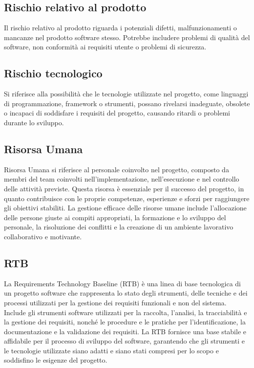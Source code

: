\subsection{Rischio relativo al prodotto} 
Il rischio relativo al prodotto riguarda i potenziali difetti, malfunzionamenti o mancanze nel prodotto software stesso. Potrebbe includere problemi di qualità del software, non conformità ai requisiti utente o problemi di sicurezza.
\subsection{Rischio tecnologico} 
Si riferisce alla possibilità che le tecnologie utilizzate nel progetto, come linguaggi di programmazione, framework o strumenti, possano rivelarsi inadeguate, obsolete o incapaci di soddisfare i requisiti del progetto, causando ritardi o problemi durante lo sviluppo.
\subsection{Risorsa Umana} 
Risorsa Umana si riferisce al personale coinvolto nel progetto, composto da membri del team coinvolti nell'implementazione, nell'esecuzione e nel controllo delle attività previste. Questa risorsa è essenziale per il successo del progetto, in quanto contribuisce con le proprie competenze, esperienze e sforzi per raggiungere gli obiettivi stabiliti. La gestione efficace delle risorse umane include l'allocazione delle persone giuste ai compiti appropriati, la formazione e lo sviluppo del personale, la risoluzione dei conflitti e la creazione di un ambiente lavorativo collaborativo e motivante. 
\subsection{RTB} 
La Requirements Technology Baseline (RTB) è una linea di base tecnologica di un progetto software che rappresenta lo stato degli strumenti, delle tecniche e dei processi utilizzati per la gestione dei requisiti funzionali e non del sistema. Include gli strumenti software utilizzati per la raccolta, l'analisi, la tracciabilità e la gestione dei requisiti, nonché le procedure e le pratiche per l'identificazione, la documentazione e la validazione dei requisiti. La RTB fornisce una base stabile e affidabile per il processo di sviluppo del software, garantendo che gli strumenti e le tecnologie utilizzate siano adatti e siano stati compresi per lo scopo e soddisfino le esigenze del progetto.
